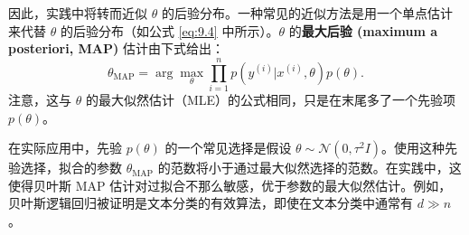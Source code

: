 因此，实践中将转而近似 $\theta$ 的后验分布。一种常见的近似方法是用一个单点估计来代替 $\theta$ 的后验分布（如公式 \eqref{eq:9.4} 中所示）。$\theta$ 的\textbf{最大后验 (maximum a posteriori, MAP)} 估计由下式给出：
\begin{equation}
    \theta_{\text{MAP}} = \arg \max_\theta \prod_{i=1}^n p(y^{(i)} | x^{(i)}, \theta) p(\theta).
    \label{eq:9.5}
\end{equation}
注意，这与 $\theta$ 的最大似然估计（MLE）的公式相同，只是在末尾多了一个先验项 $p(\theta)$。

在实际应用中，先验 $p(\theta)$ 的一个常见选择是假设 $\theta \sim \mathcal{N}(0, \tau^2 I)$。使用这种先验选择，拟合的参数 $\theta_{\text{MAP}}$ 的范数将小于通过最大似然选择的范数。在实践中，这使得贝叶斯 MAP 估计对过拟合不那么敏感，优于参数的最大似然估计。例如，贝叶斯逻辑回归被证明是文本分类的有效算法，即使在文本分类中通常有 $d \gg n$。